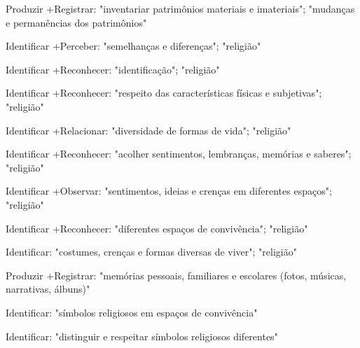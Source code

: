  Produzir +Registrar: "inventariar patrimônios materiais e imateriais"; "mudanças e permanências dos patrimônios"

 Identificar +Perceber: "semelhanças e diferenças"; "religião"

 Identificar +Reconhecer: "identificação"; "religião"

 Identificar +Reconhecer: "respeito das características físicas e subjetivas"; "religião"

 Identificar +Relacionar: "diversidade de formas de vida"; "religião"

 Identificar +Reconhecer: "acolher sentimentos, lembranças, memórias e saberes"; "religião"

 Identificar +Observar: "sentimentos, ideias e crenças em diferentes espaços"; "religião"

 Identificar +Reconhecer: "diferentes espaços de convivência"; "religião"

 Identificar: "costumes, crenças e formas diversas de viver"; "religião"

 Produzir +Registrar: "memórias pessoais, familiares e escolares (fotos, músicas, narrativas, álbuns)"

 Identificar: "símbolos religiosos em espaços de convivência"

 Identificar: "distinguir e respeitar símbolos religiosos diferentes"

